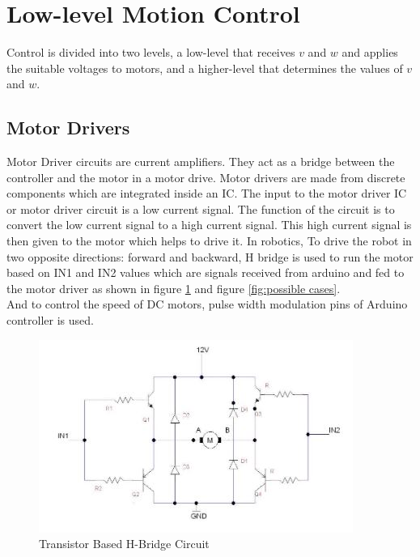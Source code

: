 \section{Low-level Motion Control}
\hspace{2cm} Control is divided into two levels, a low-level that receives $v$ and $w$ and applies the suitable voltages to motors, and a higher-level that determines the values of $v$ and $w$.
\subsection{Motor Drivers}
\hspace{2cm}Motor Driver circuits are current amplifiers. They act as a bridge between the controller and the motor in a motor drive. Motor drivers are made from discrete components which are integrated inside an IC. The input to the motor driver IC or motor driver circuit is a low current signal. The function of the circuit is to convert the low current signal to a high current signal. This high current signal is then given to the motor which helps to drive it.\cite{web003}
In robotics, To drive the robot in two opposite directions: forward and backward, H bridge is used to run the motor based on IN1 and IN2 values which are signals received from arduino and fed to the motor driver as shown in figure \ref{fig: transistor} and figure \ref{fig:possible cases}.\\
And to control the speed of DC motors, pulse width modulation pins of Arduino controller is used.
\begin{figure}[H]%
    \center%
    \includegraphics[width=.8\textwidth]{images/Alzahraa/H_bridge.JPG}%
    \caption[Transistor H-bridge]{Transistor Based H-Bridge Circuit\cite{web003}}\label{fig: transistor}%
  \end{figure} 
